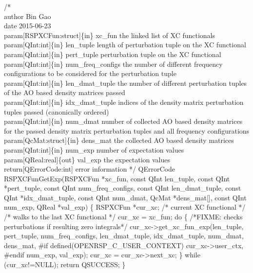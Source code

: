 /*%
    \\author Bin Gao
    \\date 2015-06-23
    \\param[RSPXCFun:struct]\{in\} xc_fun the linked list of XC functionals
    \\param[QInt:int]\{in\} len_tuple length of perturbation tuple on the XC functional
    \\param[QInt:int]\{in\} pert_tuple perturbation tuple on the XC functional
    \\param[QInt:int]\{in\} num_freq_configs the number of different frequency
        configurations to be considered for the perturbation tuple
    \\param[QInt:int]\{in\} len_dmat_tuple the number of different perturbation
        tuples of the AO based density matrices passed
    \\param[QInt:int]\{in\} idx_dmat_tuple indices of the density matrix
        perturbation tuples passed (canonically ordered)
    \\param[QInt:int]\{in\} num_dmat number of collected AO based density matrices for
        the passed density matrix perturbation tuples and all frequency configurations
    \\param[QcMat:struct]\{in\} dens_mat the collected AO based density matrices
    \\param[QInt:int]\{in\} num_exp number of expectation values
    \\param[QReal:real]\{out\} val_exp the expectation values
    \\return[QErrorCode:int] error information
*/
QErrorCode RSPXCFunGetExp(RSPXCFun *xc_fun,
                          const QInt len_tuple,
                          const QInt *pert_tuple,
                          const QInt num_freq_configs,
                          const QInt len_dmat_tuple,
                          const QInt *idx_dmat_tuple,
                          const QInt num_dmat,
                          QcMat *dens_mat[],
                          const QInt num_exp,
                          QReal *val_exp)
\{
    RSPXCFun *cur_xc;  /* current XC functional */
    /* walks to the last XC functional */
    cur_xc = xc_fun;
    do \{
/*FIXME: checks perturbations if resulting zero integrals*/
        cur_xc->get_xc_fun_exp(len_tuple,
                               pert_tuple,
                               num_freq_configs,
                               len_dmat_tuple,
                               idx_dmat_tuple,
                               num_dmat,
                               dens_mat,
#if defined(OPENRSP_C_USER_CONTEXT)
                               cur_xc->user_ctx,
#endif
                               num_exp,
                               val_exp);
        cur_xc = cur_xc->next_xc;
    \} while (cur_xc!=NULL);
    return QSUCCESS;
\}

